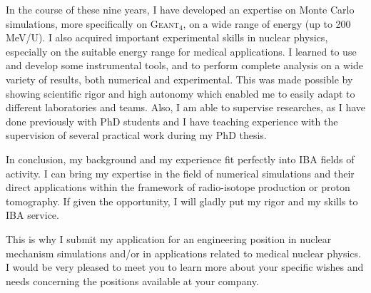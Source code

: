 \documentclass[11pt,a4paper,sans]{moderncv}        %
\begin{document}
In the course of these nine years, I have developed an expertise on Monte Carlo simulations, more specifically on G\textsc{eant}$_4$, on a wide range of energy (up to 200 MeV/U).
I also acquired important experimental skills in nuclear physics, especially on the suitable energy range for medical applications.
I learned to use and develop some instrumental tools, and to perform complete analysis on a wide variety of results, both numerical and experimental. 
This was made possible by showing scientific rigor and high autonomy which enabled me to easily adapt to different laboratories and teams.
Also, I am able to supervise researches, as I have done previously with PhD students and I have teaching experience with the supervision of several practical work during my PhD thesis.

In conclusion, my background and my experience fit perfectly into IBA fields of activity.
I can bring my expertise in the field of numerical simulations and their direct applications within the framework of radio-isotope production or proton tomography.
If given the opportunity, I will gladly put my rigor and my skills to IBA service.

This is why I submit my application for an engineering position in nuclear mechanism simulations and/or in applications related to medical nuclear physics.
I would be very pleased to meet you to learn more about your specific wishes and needs concerning the positions available at your company.

\makeletterclosing
\end{document}
